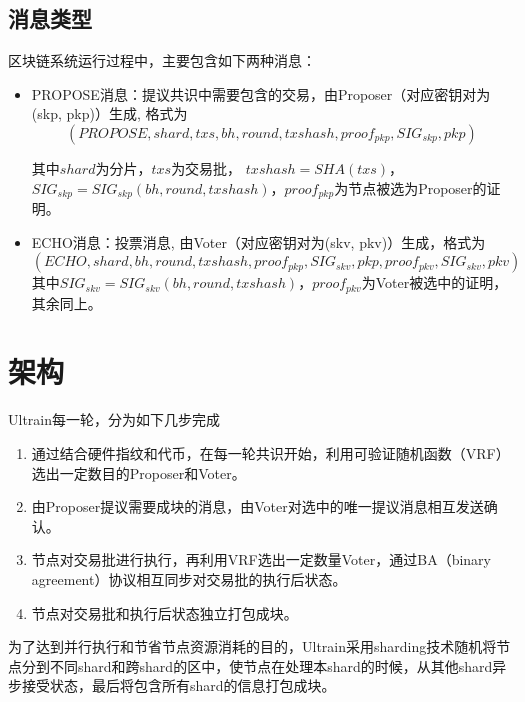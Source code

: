\documentclass[12pt, UTF8]{article}
\begin{document}
\subsection{消息类型}
区块链系统运行过程中，主要包含如下两种消息：
\begin{itemize}
\item PROPOSE消息：提议共识中需要包含的交易，由Proposer（对应密钥对为(skp, pkp)）生成, 格式为
\begin{equation}
(PROPOSE, shard, txs, bh, round, txshash, proof_{pkp}, SIG_{skp}, pkp)
\end{equation}

其中$shard$为分片，$txs$为交易批， $txshash=SHA(txs)$， $SIG_{skp}= SIG_{skp}(bh, round, txshash)$，$proof_{pkp}$为节点被选为Proposer的证明。
\item ECHO消息：投票消息, 由Voter（对应密钥对为(skv, pkv)）生成，格式为
\begin{equation}
(ECHO, shard, bh, round, txshash, proof_{pkp}, SIG_{skv}, pkp, proof_{pkv}, SIG_{skv}, pkv)
\end{equation}
其中$SIG_{skv}= SIG_{skv}(bh, round, txshash)$，$proof_{pkv}$为Voter被选中的证明，其余同上。
\end{itemize}

\section{架构}
Ultrain每一轮，分为如下几步完成
\begin{enumerate}
\item 通过结合硬件指纹和代币，在每一轮共识开始，利用可验证随机函数（VRF）选出一定数目的Proposer和Voter。
\item 由Proposer提议需要成块的消息，由Voter对选中的唯一提议消息相互发送确认。
\item 节点对交易批进行执行，再利用VRF选出一定数量Voter，通过BA（binary agreement）协议相互同步对交易批的执行后状态。
\item 节点对交易批和执行后状态独立打包成块。
\end{enumerate}
为了达到并行执行和节省节点资源消耗的目的，Ultrain采用sharding技术随机将节点分到不同shard和跨shard的区中，使节点在处理本shard的时候，从其他shard异步接受状态，最后将包含所有shard的信息打包成块。
\end{document}
